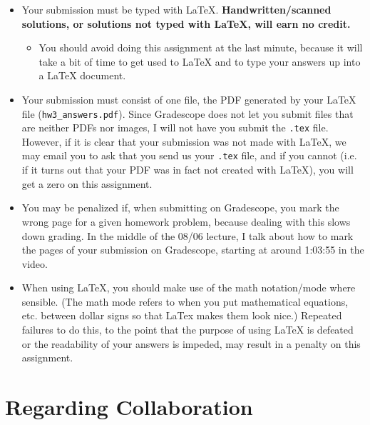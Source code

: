 \documentclass{article}
\begin{document}
\begin{itemize}[itemsep=0mm, parsep=0pt]
\item Your submission must be typed with LaTeX. \textbf{Handwritten/scanned solutions, or solutions not typed with LaTeX, will earn no credit.}
    \begin{itemize}[itemsep=0mm, parsep=0pt]
    \item You should avoid doing this assignment at the last minute, because it will take a bit of time to get used to LaTeX and to type your answers up into a LaTeX document.
    \end{itemize}
\item Your submission must consist of one file, the PDF generated by your LaTeX file (\lstinline{hw3_answers.pdf}). Since Gradescope does not let you submit files that are neither PDFs nor images, I will not have you submit the \lstinline{.tex} file. However, if it is clear that your submission was not made with LaTeX, we may email you to ask that you send us your \lstinline{.tex} file, and if you cannot (i.e. if it turns out that your PDF was in fact not created with LaTeX), you will get a zero on this assignment.
\item You may be penalized if, when submitting on Gradescope, you mark the wrong page for a given homework problem, because dealing with this slows down grading. In the middle of the 08/06 lecture, I talk about how to mark the pages of your submission on Gradescope, starting at around 1:03:55 in the video.
\item When using LaTeX, you should make use of the math notation/mode where sensible. (The math mode refers to when you put mathematical equations, etc. between dollar signs so that LaTex makes them look nice.) Repeated failures to do this, to the point that the purpose of using LaTeX is defeated or the readability of your answers is impeded, may result in a penalty on this assignment.
\end{itemize}

\section{Regarding Collaboration}
\end{document}
